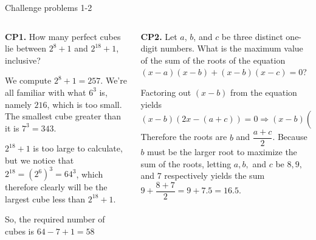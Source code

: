 \documentclass[9pt,aspectratio=169]{beamer}
\begin{document}
\begin{frame}{Challenge problems 1-2}
  \begin{columns}[T]
    \begin{column}{0.5\textwidth}
      \begin{problem}
        \textbf{CP1.} How many perfect cubes lie between $2^8+1$ and $2^{18}+1$, inclusive?
      \end{problem}
      We compute $2^8+1=257$. We're all familiar with what $6^3$ is, namely $216$, which is too small. The smallest cube greater than it is $7^3=343$. 
      
      $2^{18}+1$ is too large to calculate, but we notice that $2^{18}=(2^6)^3=64^3$, which therefore clearly will be the largest cube less than $2^{18}+1$. 
      
      So, the required number of cubes is $64-7+1= \boxed{58}$
    \end{column}
    \begin{column}{0.5\textwidth}
      \begin{problem}
        \textbf{CP2.} Let $a$, $b$, and $c$ be three distinct one-digit numbers. What is the maximum value of the sum of the roots of the equation $(x-a)(x-b)+(x-b)(x-c)=0$? 
      \end{problem}
      Factoring out $(x-b)$ from the equation yields 
      \[(x-b)(2x-(a+c))=0 \Rightarrow (x-b)\left(x-\frac{a+c}{2}\right)=0.\] Therefore the roots are $b$ and $\dfrac{a+c}{2}$. Because $b$ must be the larger root to maximize the sum of the roots, letting $a,b,$ and $c$ be $8,9,$ and $7$ respectively yields the sum $9+\dfrac{8+7}{2} = 9+7.5 = \boxed{16.5}$.
    \end{column}
  \end{columns}
\end{frame}
\end{document}
